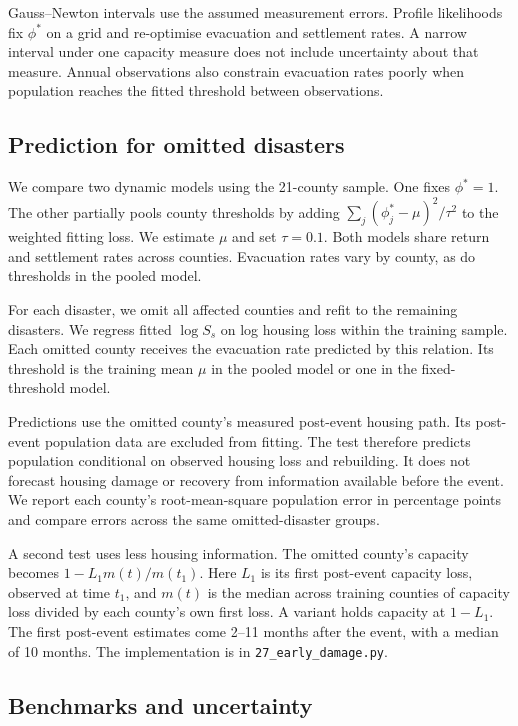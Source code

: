 \documentclass[11pt]{article}
\begin{document}
Gauss--Newton intervals use the assumed measurement errors. Profile likelihoods fix $\phi^*$ on a grid and re-optimise evacuation and settlement rates. A narrow interval under one capacity measure does not include uncertainty about that measure. Annual observations also constrain evacuation rates poorly when population reaches the fitted threshold between observations.

\subsection*{Prediction for omitted disasters}

We compare two dynamic models using the 21-county sample. One fixes $\phi^*=1$. The other partially pools county thresholds by adding $\sum_j(\phi_j^*-\mu)^2/\tau^2$ to the weighted fitting loss. We estimate $\mu$ and set $\tau=0.1$. Both models share return and settlement rates across counties. Evacuation rates vary by county, as do thresholds in the pooled model.

For each disaster, we omit all affected counties and refit to the remaining disasters. We regress fitted $\log S_s$ on log housing loss within the training sample. Each omitted county receives the evacuation rate predicted by this relation. Its threshold is the training mean $\mu$ in the pooled model or one in the fixed-threshold model.

Predictions use the omitted county's measured post-event housing path. Its post-event population data are excluded from fitting. The test therefore predicts population conditional on observed housing loss and rebuilding. It does not forecast housing damage or recovery from information available before the event. We report each county's root-mean-square population error in percentage points and compare errors across the same omitted-disaster groups.

A second test uses less housing information. The omitted county's capacity becomes $1-L_1m(t)/m(t_1)$. Here $L_1$ is its first post-event capacity loss, observed at time $t_1$, and $m(t)$ is the median across training counties of capacity loss divided by each county's own first loss. A variant holds capacity at $1-L_1$. The first post-event estimates come 2--11 months after the event, with a median of 10 months. The implementation is in \texttt{27\_early\_damage.py}.

\subsection*{Benchmarks and uncertainty}
\end{document}
